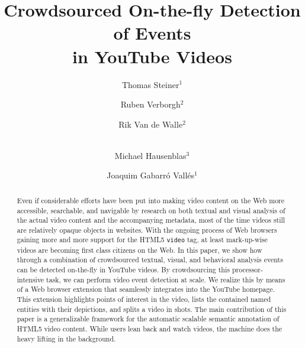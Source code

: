 \documentclass[runningheads,a4paper]{llncs}
\begin{document}
\mainmatter

\title{Crowdsourced On-the-fly Detection of Events\\ in YouTube Videos}


%
%
\author{Thomas Steiner$^{1}$ \and Ruben Verborgh$^{2}$ \and Rik Van de Walle$^{2}$ \and \\Michael Hausenblas$^{3}$ \and Joaquim Gabarr\'{o} Vall\'{e}s$^{1}$}
%

\maketitle

\begin{abstract}
Even if considerable efforts have been put into making video content on the Web more accessible, searchable, and navigable by research on both textual and visual analysis of the actual video content and the accompanying metadata, most of the time videos still are relatively opaque objects in websites. With the ongoing process of Web browsers gaining more and more support for the HTML5 \texttt{video} tag, at least mark-up-wise videos are becoming first class citizens on the Web. In this paper, we show how through a combination of crowdsourced textual, visual, and behavioral analysis events can be detected on-the-fly in YouTube videos. By crowdsourcing this processor-intensive task, we can perform video event detection at scale. We realize this by means of a Web browser extension that seamlessly integrates into the YouTube homepage. This extension highlights points of interest in the video, lists the contained named entities with their depictions, and splits a video in shots. The main contribution of this paper is a generalizable framework for the automatic scalable semantic annotation of HTML5 video content.  While users lean back and watch videos, the machine does the heavy lifting in the background.
\end{abstract}
\end{document}
